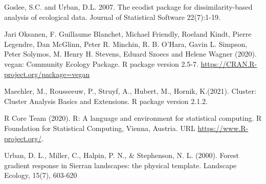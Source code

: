 \documentclass[
  12pt,
]{article}
\begin{document}
Goslee, S.C. and Urban, D.L. 2007. The ecodist package for
dissimilarity-based analysis of ecological data. Journal of Statistical
Software 22(7):1-19.

Jari Oksanen, F. Guillaume Blanchet, Michael Friendly, Roeland Kindt,
Pierre Legendre, Dan McGlinn, Peter R. Minchin, R. B. O'Hara, Gavin L.
Simpson, Peter Solymos, M. Henry H. Stevens, Eduard Szoecs and Helene
Wagner (2020). vegan: Community Ecology Package. R package version
2.5-7. \url{https://CRAN.R-project.org/package=vegan}

Maechler, M., Rousseeuw, P., Struyf, A., Hubert, M., Hornik, K.(2021).
Cluster: Cluster Analysis Basics and Extensions. R package version
2.1.2.

R Core Team (2020). R: A language and environment for statistical
computing. R Foundation for Statistical Computing, Vienna, Austria. URL
\url{https://www.R-project.org/}.

Urban, D. L., Miller, C., Halpin, P. N., \& Stephenson, N. L. (2000).
Forest gradient response in Sierran landscapes: the physical template.
Landscape Ecology, 15(7), 603-620
\end{document}
